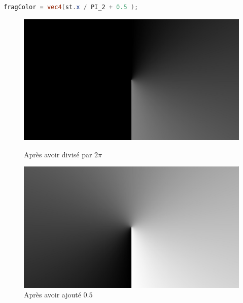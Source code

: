 \begin{minipage}{\linewidth}
\begin{lstlisting}[language=GLSL, caption=Remap de l'angle,captionpos=b,frame=single]
fragColor = vec4(st.x / PI_2 + 0.5 );
\end{lstlisting}
\end{minipage}

\begin{figure}[h]
  \begin{minipage}[b]{0.45\linewidth}
    \centering
    \includegraphics[width=\linewidth]{images/polar00.JPG}
    \caption{Après avoir divisé par $2\pi$}
    \label{polar00}
  \end{minipage}
  \hspace{0.1\linewidth} %
  \begin{minipage}[b]{0.45\linewidth}
    \centering
    \includegraphics[width=\linewidth]{images/polar01.JPG}
    \caption{Après avoir ajouté $0.5$}
    \label{polar01}
  \end{minipage}
\end{figure}

